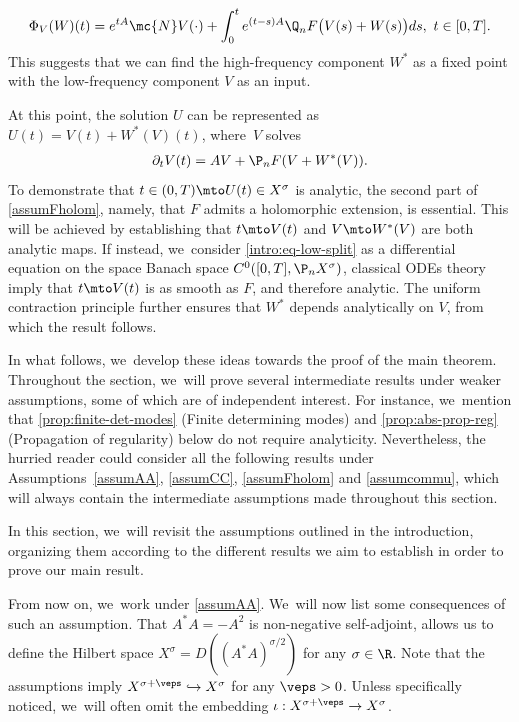 \begin{align*}
\Phi_V(W)(t)=e^{tA}\mc{N}V(\cdot)+\int_0^t e^{(t-s)A}\Q_n F\big(V(s)+W(s)\big)ds,\ t\in [0, T].
\end{align*}
This suggests that we can find the high-frequency component $W^*$ as a fixed point with the low-frequency component $V$ as an input.

At this point, the solution $U$ can be represented as $U(t)=V(t)+W^*(V)(t)$, where~$V$ solves
\begin{align}\label{intro:eq-low-split}
\partial_t V(t)=AV+\P_n F(V+W^*(V)).
\end{align}
To demonstrate that $t\in (0, T)\mto U(t)\in X^\sigma$ is analytic, the second part of \cref{assumFholom}, namely, that $F$ admits a holomorphic extension, is essential. This will be achieved by establishing that $t\mto V(t)$ and $V\mto W^*(V)$ are both analytic maps. If instead, we~consider \eqref{intro:eq-low-split} as a differential equation on the space Banach space $C^0([0, T], \P_n X^\sigma)$, classical ODEs theory imply that $t\mto V(t)$ is as smooth as $F$, and therefore analytic. The uniform contraction principle further ensures that $W^*$ depends analytically on $V$, from which the result follows.

In what follows, we~develop these ideas towards the proof of the main theorem. Throughout the section, we~will prove several intermediate results under weaker assumptions, some of which are of independent interest. For instance, we~mention that \cref{prop:finite-det-modes} (Finite determining modes) and \cref{prop:abs-prop-reg} (Propagation of regularity) below do not require analyticity. Nevertheless, the hurried reader could consider all the following results under Assumptions~\ref{assumAA}, \ref{assumCC}, \ref{assumFholom} and \ref{assumcommu}, which will always contain the intermediate assumptions made throughout this section.

 In this section, we~will revisit the assumptions outlined in the introduction, organizing them according to the different results we aim to establish in order to prove our main result.

From now on, we~work under \cref{assumAA}. We~will now list some consequences of such an assumption. That $A^*A=-A^2$ is non-negative self-adjoint, allows us to define the Hilbert space $X^{\sigma}=D((A^*A)^{\sigma/2})$ for any $\sigma\in\R$. Note that the assumptions imply $X^{\sigma+\veps}\hookrightarrow X^{\sigma} $ for any $\veps>0$. Unless specifically noticed, we~will often omit the embedding $\iota: X^{\sigma+\veps}\to X^{\sigma}$.

